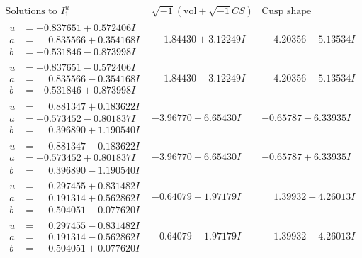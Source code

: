 \documentclass[1p]{elsarticle_modified}
\theoremstyle{definition}
\newcommand{\I}{\sqrt{-1}}
\begin{document}
$$\begin{array}{c|c|c}  
\text{Solutions to }I^u_{1}& \I (\text{vol} + \sqrt{-1}CS) & \text{Cusp shape}\\
 \hline 
\begin{aligned}
u &= -0.837651 + 0.572406 I \\
a &= \phantom{-}0.835566 + 0.354168 I \\
b &= -0.531846 - 0.873998 I\end{aligned}
 & \phantom{-}1.84430 + 3.12249 I & \phantom{-}4.20356 - 5.13534 I \\ \hline\begin{aligned}
u &= -0.837651 - 0.572406 I \\
a &= \phantom{-}0.835566 - 0.354168 I \\
b &= -0.531846 + 0.873998 I\end{aligned}
 & \phantom{-}1.84430 - 3.12249 I & \phantom{-}4.20356 + 5.13534 I \\ \hline\begin{aligned}
u &= \phantom{-}0.881347 + 0.183622 I \\
a &= -0.573452 - 0.801837 I \\
b &= \phantom{-}0.396890 + 1.190540 I\end{aligned}
 & -3.96770 + 6.65430 I & -0.65787 - 6.33935 I \\ \hline\begin{aligned}
u &= \phantom{-}0.881347 - 0.183622 I \\
a &= -0.573452 + 0.801837 I \\
b &= \phantom{-}0.396890 - 1.190540 I\end{aligned}
 & -3.96770 - 6.65430 I & -0.65787 + 6.33935 I \\ \hline\begin{aligned}
u &= \phantom{-}0.297455 + 0.831482 I \\
a &= \phantom{-}0.191314 + 0.562862 I \\
b &= \phantom{-}0.504051 - 0.077620 I\end{aligned}
 & -0.64079 + 1.97179 I & \phantom{-}1.39932 - 4.26013 I \\ \hline\begin{aligned}
u &= \phantom{-}0.297455 - 0.831482 I \\
a &= \phantom{-}0.191314 - 0.562862 I \\
b &= \phantom{-}0.504051 + 0.077620 I\end{aligned}
 & -0.64079 - 1.97179 I & \phantom{-}1.39932 + 4.26013 I \\ \hline\begin{aligned}

\end{aligned}
\end{array}$$
\end{document}
